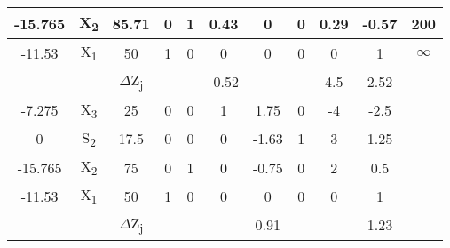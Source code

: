 \begin{table}[htp]
{\begin{tabular}{|c|c|c|c|c|c|c|c|c|c|c|}
	-15.765 & X\textsubscript{2} & 85.71   					  & 0      & 1      & 0.43  & 0     & 0     & 0.29  & -0.57 & 200      \\ \hline
	-11.53  & X\textsubscript{1} & 50      					  & 1      & 0      & 0     & 0     & 0     & 0     & 1     & $\infty$ \\ \hline
			&    				 & $\Delta$Z\textsubscript{j} &        &        & -0.52 &       &       & 4.5   & 2.52  &          \\ \hline\hline
	-7.275  & X\textsubscript{3} & 25      					  & 0      & 0      & 1     & 1.75  & 0     & -4    & -2.5  &          \\ \hline
	0       & S\textsubscript{2} & 17.5    					  & 0      & 0      & 0     & -1.63 & 1     & 3     & 1.25  &          \\ \hline
	-15.765 & X\textsubscript{2} & 75      					  & 0      & 1      & 0     & -0.75 & 0     & 2     & 0.5   &          \\ \hline
	-11.53  & X\textsubscript{1} & 50      					  & 1      & 0      & 0     & 0     & 0     & 0     & 1     &          \\ \hline
			&    				 & $\Delta$Z\textsubscript{j} &        &        &       & 0.91  &       &       & 1.23  &          \\ \hline
	\end{tabular} 
	}
	\label{tab:q2}
\end{table}

\clearpage